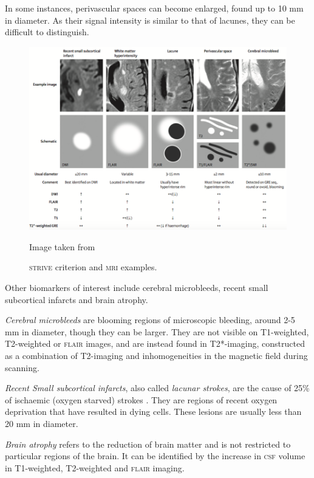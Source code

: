 In some instances, perivascular spaces can become enlarged, found up to 10 mm in diameter. As their signal intensity is similar to that of lacunes, they can be difficult to distinguish. 

\begin{figure}[ht]
	\centering
	\includegraphics[width = \textwidth]{Images/2_STRIVE.png}
	\caption{\textsc{strive} criterion and \textsc{mri} examples.}
	\small Image taken from \cite{WardlawJ.M.2013Nsfr}
\end{figure}

Other biomarkers of interest include cerebral microbleeds, recent small subcortical infarcts and brain atrophy. 

\textit{Cerebral microbleeds} are blooming regions of microscopic bleeding, around 2-5 mm in diameter, though they can be larger. They are not visible on T1-weighted, T2-weighted or \textsc{flair} images, and are instead found in T2*-imaging, constructed as a combination of T2-imaging and inhomogeneities in the magnetic field during scanning. 

\textit{Recent Small subcortical infarcts}, also called \textit{lacunar strokes}, are the cause of 25\% of ischaemic (oxygen starved) strokes \cite{WardlawJ.M.2013Nsfr}. They are regions of recent oxygen deprivation that have resulted in dying cells. These lesions are usually less than 20 mm in diameter. 

\textit{Brain atrophy} refers to the reduction of brain matter and is not restricted to particular regions of the brain. It can be identified by the increase in \textsc{csf} volume in T1-weighted, T2-weighted and \textsc{flair} imaging.

